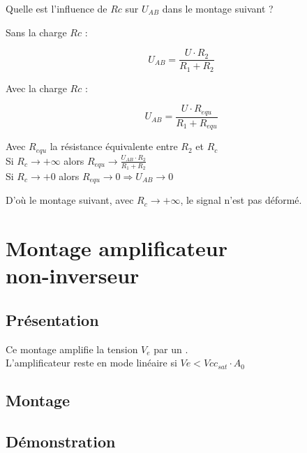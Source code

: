 \begin{question}
Quelle est l’influence de $Rc$ sur $U_{AB}$ dans le montage suivant ?
\end{question}

\begin{reponse}

Sans la charge $Rc$ : 

$$ U_{AB}= \frac{U \cdot R_2}{R_1+R_2}$$

Avec  la charge $Rc$ :

$$ U_{AB}= \frac{U \cdot R_{equ}}{R_1+R_{equ}}$$


Avec $R_{equ}$ la résistance équivalente entre $R_2$ et $R_c$ \\



Si $R_c \rightarrow + \infty$ alors $R_{equ} \rightarrow \frac{U_{AB} \cdot R_2}{R_1+R_2}$ \\

Si $R_c \rightarrow + 0 $ alors $R_{equ} \rightarrow 0 \Rightarrow U_{AB} \rightarrow 0$

\end{reponse}


D'où le montage suivant, avec $R_c \rightarrow + \infty$, le signal n'est pas déformé.





\chapter{Montage amplificateur \\non-inverseur }


\section{Présentation}

Ce montage amplifie la tension $V_e$ par un . \\
L’amplificateur reste en mode linéaire si $Ve < Vcc_{sat} \cdot A_0$

\section{Montage}


\section{Démonstration }

